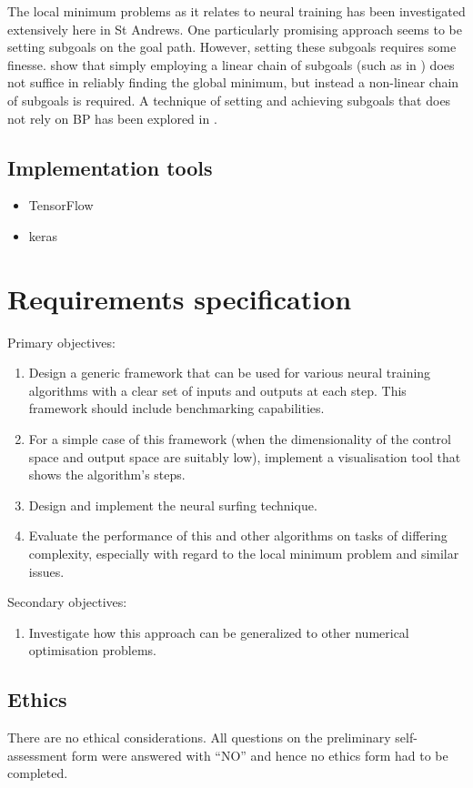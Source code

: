 The local minimum problems as it relates to neural training has been investigated extensively here in St Andrews. 
One particularly promising approach seems to be setting subgoals on the goal path.
However, setting these subgoals requires some finesse.
\textcite{lewis1999} show that simply employing a linear chain of subgoals (such as in \textcite{gorse1997}) does not suffice in reliably finding the global minimum, but instead a non-linear chain of subgoals is required.
A technique of setting and achieving subgoals that does not rely on BP has been explored in \textcite{weir2000}.

\section{Implementation tools}
\begin{itemize}
    \item TensorFlow
    \item keras
\end{itemize}
\todo

\chapter{Requirements specification}
Primary objectives:
\begin{enumerate}
    \item Design a generic framework that can be used for various neural training algorithms
    with a clear set of inputs and outputs at each step. This framework should include
    benchmarking capabilities.
    \item For a simple case of this framework (when the dimensionality of the control space
    and output space are suitably low), implement a visualisation tool that shows the
    algorithm’s steps.
    \item Design and implement the neural surfing technique.
    \item Evaluate the performance of this and other algorithms on tasks of differing
    complexity, especially with regard to the local minimum problem and similar issues.
\end{enumerate}
Secondary objectives:
\begin{enumerate}
    \item Investigate how this approach can be generalized to other numerical optimisation problems.
\end{enumerate}

\section{Ethics}
There are no ethical considerations. 
All questions on the preliminary self-assessment form were answered with ``NO'' and hence no ethics form had to be completed.
